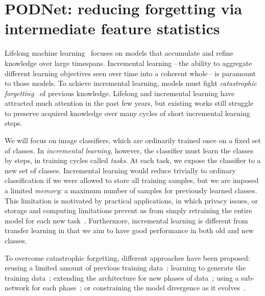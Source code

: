 \section{PODNet: reducing forgetting via intermediate feature statistics}

Lifelong machine
learning~\citep{robins1995catastrophicforgetting,french1999catastrophicforgetting,thrun1998lifelonglearning}
focuses on models that accumulate and refine knowledge over large timespans. Incremental learning
--\,the ability to aggregate different learning objectives seen over time into a coherent whole\,--
is paramount to those models. To achieve incremental learning, models must fight
\textit{catastrophic
    forgetting}~\citep{robins1995catastrophicforgetting,french1999catastrophicforgetting} of previous
knowledge. Lifelong and incremental learning have attracted much attention in the past few years,
but existing works still struggle to preserve acquired knowledge over many cycles of short
incremental learning steps.

We will focus on image classifiers, which are ordinarily trained once on a fixed set of classes. In
\textit{incremental learning}, however, the classifier must learn the classes by steps, in training
cycles called \textit{tasks}. At each task, we expose the classifier to a new set of classes.
Incremental learning would reduce trivially to ordinary classification if we were allowed to store
all training samples, but we are imposed a limited \textit{memory}: a maximum number of samples for
previously learned classes. This limitation is motivated by practical applications, in which privacy
issues, or storage and computing limitations prevent us from simply retraining the entire model for
each new task~\citep{li2018lwf,lomonaco2017core50}. Furthermore, incremental learning is different
from transfer learning in that we aim to have good performance in both old and new classes.

To overcome catastrophic forgetting, different approaches have been proposed: reusing a limited
amount of previous training data~\citep{rebuffi2017icarl,castro2018end_to_end_inc_learn}; learning to
generate the training data~\citep{kemker2018fearnet,shin2017deep_generative_replay}; extending the
architecture for new phases of
data~\citep{yoon2018dynamically_expandable_networks,li2019learning_to_grow}; using a sub-network for
each phase~\citep{fernando2017path_net,golkar2019neural_pruning}; or constraining the model
divergence as it
evolves~\citep{kirkpatrick2017ewc,lopezpaz2017gem,aljundi2018MemoryAwareSynapses,li2018lwf,rebuffi2017icarl,castro2018end_to_end_inc_learn}.


